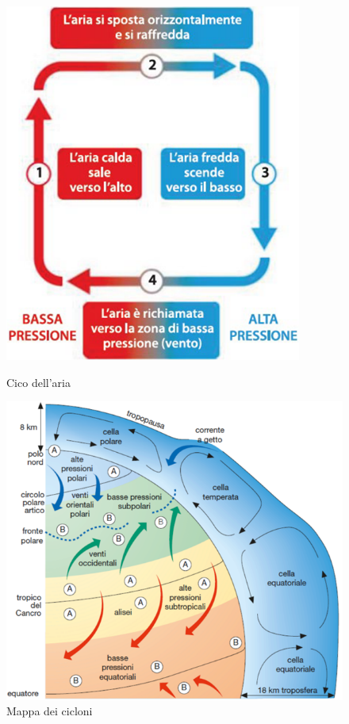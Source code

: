 \documentclass{article}
\begin{document}
\begin{figure}[ht!]
    \centering
    \begin{minipage}{0.37\textwidth}
        \centering
        \includegraphics[width=\linewidth]{media/geo_fisica/ciclo_aria.png}
        \caption*{Cico dell'aria}
    \end{minipage}\hfill
    \begin{minipage}{0.60\textwidth}
        \centering
        \includegraphics[width=\linewidth]{media/geo_fisica/cicloni.png}
        \caption*{Mappa dei cicloni}
    \end{minipage}
\end{figure}
\end{document}
